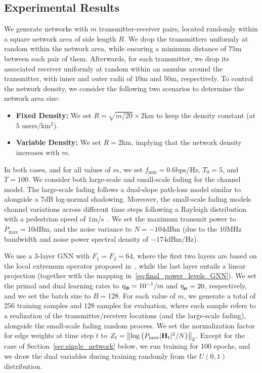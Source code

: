 \documentclass[lettersize,journal]{IEEEtran}
\begin{document}
\subsection{Experimental Results}\label{sec:exp_results}
We generate networks with $m$ transmitter-receiver pairs, located randomly within a square network area of side length $R$. We drop the transmitters uniformly at random within the network area, while ensuring a minimum distance of $75$m between each pair of them. Afterwards, for each transmitter, we drop its associated receiver uniformly at random within an annulus around the transmitter, with inner and outer radii of $10$m and $50$m, respectively. To control the network density, we consider the following two scenarios to determine the network area size:
\begin{itemize}
    \item \textbf{Fixed Density:} We set $R = \sqrt{m / 20} \times 2$km to keep the density constant (at $5$ users/km$^2$).
    \item \textbf{Variable Density:} We set $R=2$km, implying that the network density increases with $m$.
\end{itemize}
In both cases, and for all values of $m$, we set $f_{\min} = 0.6$bps/Hz, $T_0=5$, and $T=100$. We consider both large-scale and small-scale fading for the channel model. The large-scale fading follows a dual-slope path-loss model similar to~\cite{zhang2015downlink,andrews2016we,naderializadeh2022learning} alongside a $7$dB log-normal shadowing. Moreover, the small-scale fading models channel variations across different time steps following a Rayleigh distribution with a pedestrian speed of $1$m/s~\cite{li2002simulation}. We set the maximum transmit power to $P_{\max}=10$dBm, and the noise variance to $N=-104$dBm (due to the $10$MHz bandwidth and noise power spectral density of $-174$dBm/Hz).

We use a $3$-layer GNN with $F_1=F_2=64$, where the first two layers are based on the local extremum operator proposed in~\cite{ranjan2020asap}, while the last layer entails a linear projection (together with the mapping in~\eqref{eq:final_power_levels_GNN}). We set the primal and dual learning rates to $\eta_{\boldsymbol{\phi}} = 10^{-1} / m$ and $\eta_{\boldsymbol{\mu}} = 20$, respectively, and we set the batch size to $B=128$. For each value of $m$, we generate a total of $256$ training samples and $128$ samples for evaluation, where each sample refers to a realization of the transmitter/receiver locations (and the large-scale fading), alongside the small-scale fading random process. We set the normalization factor for edge weights at time step $t$ to $Z_t = \left\|\log\left(P_{\max}|{\mathbf H}_t|^2 / N\right)\right\|_2$. Except for the case of Section~\ref{sec:single_network} below, we run training for $100$ epochs, and we draw the dual variables during training randomly from the $U(0,1)$ distribution.
\end{document}
